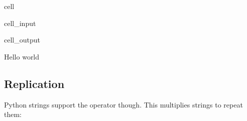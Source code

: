 \documentclass[letterpaper,10pt,english]{jupyterBook}
\begin{document}
\begin{sphinxuseclass}{cell}\begin{sphinxVerbatimInput}

\begin{sphinxuseclass}{cell_input}
\begin{sphinxVerbatim}[commandchars=\\\{\}]
    
\end{sphinxVerbatim}

\end{sphinxuseclass}\end{sphinxVerbatimInput}
\begin{sphinxVerbatimOutput}

\begin{sphinxuseclass}{cell_output}
\begin{sphinxVerbatim}[commandchars=\\\{\}]
\PYGZsq{}Hello world\PYGZsq{}
\end{sphinxVerbatim}

\end{sphinxuseclass}\end{sphinxVerbatimOutput}

\end{sphinxuseclass}

\subsection{Replication}
\label{\detokenize{datatypes:replication}}
\sphinxAtStartPar
Python strings support the \sphinxcode{\sphinxupquote{*}} operator though.
This multiplies strings to repeat them:
\end{document}
